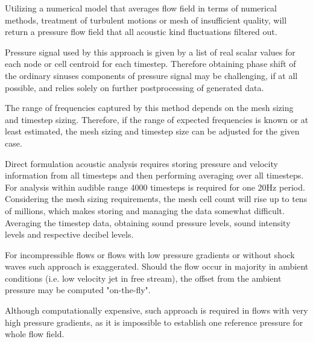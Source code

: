 Utilizing a numerical model that averages flow field in terms of numerical methods, treatment of turbulent motions or mesh of insufficient quality, will return a pressure flow field that all acoustic kind fluctuations filtered out. 

Pressure signal used by this approach is given by a list of real scalar values for each node or cell centroid for each timestep. Therefore obtaining phase shift of the ordinary sinuses components of pressure signal may be challenging, if at all possible, and relies solely on further postprocessing of generated data. 

The range of frequencies captured by this method depends on the mesh sizing and timestep sizing. Therefore, if the range of expected frequencies is known or at least estimated, the mesh sizing and timestep size can be adjusted for the given case.
 
Direct formulation acoustic analysis requires storing pressure and velocity information from all timesteps and then performing averaging over all timesteps. For analysis within audible range 4000 timesteps is required for one 20Hz period. Considering the mesh sizing requirements, the mesh cell count will rise up to tens of millions, which makes storing and managing the data somewhat difficult. Averaging the timestep data, obtaining sound pressure levels, sound intensity levels and respective decibel levels. 

For incompressible flows or flows with low pressure gradients or without shock waves such approach is exaggerated. Should the flow occur in majority in ambient conditions (i.e. low velocity jet in free stream), the offset from the ambient pressure may be computed "on-the-fly".

Although computationally expensive, such approach is required in flows with very high pressure gradients, as it is impossible to establish one reference pressure for whole flow field.




